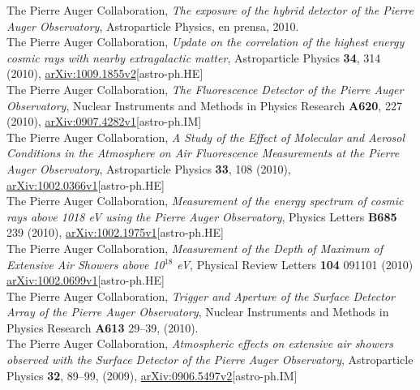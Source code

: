 \documentclass[11pt, a4paper]{article}
\newcommand{\years}[1]{\marginnote{\scriptsize #1}}
\begin{document}
\years{2010}The Pierre Auger Collaboration, {\emph{The exposure of the hybrid
detector of the Pierre Auger Observatory}}, Astroparticle Physics, en prensa,
2010.\\

\years{2010}The Pierre Auger Collaboration, {\emph{Update on the correlation of
the highest energy cosmic rays with nearby extragalactic matter}},
Astroparticle Physics {\bf 34}, 314 (2010),
\href{http://arxiv.org/abs/1009.1855}{arXiv:1009.1855v2}[astro-ph.HE]\\

\years{2010}The Pierre Auger Collaboration, {\emph{The Fluorescence Detector of
the Pierre Auger Observatory}}, Nuclear Instruments and Methods in Physics
Research {\bf A620}, 227 (2010),
\href{http://arxiv.org/abs/0907.4282}{arXiv:0907.4282v1}[astro-ph.IM]\\

\years{2010}The Pierre Auger Collaboration, {\emph{A Study of the Effect of
Molecular and Aerosol Conditions in the Atmosphere on Air Fluorescence
Measurements at the Pierre Auger Observatory}}, Astroparticle Physics {\bf 33},
108 (2010),
\href{http://arxiv.org/abs/0907.4282}{arXiv:1002.0366v1}[astro-ph.HE]\\

\years{2010}The Pierre Auger Collaboration, {\emph{Measurement of the energy
spectrum of cosmic rays above 1018 eV using the Pierre Auger Observatory}},
Physics Letters {\bf B685} 239 (2010),
\href{http://arxiv.org/abs/1002.1975}{arXiv:1002.1975v1}[astro-ph.HE]\\

\years{2010}The Pierre Auger Collaboration, {\emph{Measurement of the Depth of
Maximum of Extensive Air Showers above 10$^{18}$ eV}}, Physical Review Letters
{\bf 104} 091101 (2010)
\href{http://arxiv.org/abs/1002.0699}{arXiv:1002.0699v1}[astro-ph.HE]\\

\years{2010}The Pierre Auger Collaboration, {\emph{Trigger and Aperture of the
Surface Detector Array of the Pierre Auger Observatory}}, Nuclear Instruments
and Methods in Physics Research {\bf A613} 29--39, (2010).\\

\years{2009} The Pierre Auger Collaboration, {\emph{Atmospheric effects on
extensive air showers observed with the Surface Detector of the Pierre Auger
Observatory}}, Astroparticle Physics {\bf 32}, 89--99, (2009),
\href{http://arxiv.org/abs/0906.5497/}{arXiv:0906.5497v2}[astro-ph.IM]\\
\end{document}
